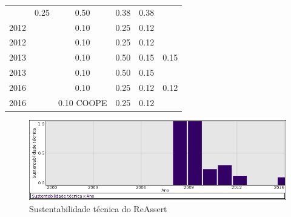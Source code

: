 \begin{table}[H]
\begin{tabular}{| l | c | c | c | c | c |}
          &
          0.25
          &
          0.50
          &
          0.38
          &
            {\color{red} 0.38}
          \\
            2012
          &
          
          &
          0.10
          &
          0.25
          &
          0.12
          &
          \\
            2012
          &
          
          &
          0.10
          &
          0.25
          &
          0.12
          &
          \\
\hline
            2013
          &
          
          &
          0.10
          &
          0.50
          &
          0.15
          &
            {\color{red} 0.15}
          \\
            2013
          &
          
          &
          0.10
          &
          0.50
          &
          0.15
          &
          \\
\hline
            2016
          &
          
          &
          0.10
          &
          0.25
          &
          0.12
          &
            {\color{red} 0.12}
          \\
            2016
          &
          
          &
          0.10
            {\tiny COOPE}
          &
          0.25
          &
          0.12
          &
          \\
\hline
\end{tabular}
\end{table}

\begin{figure}[h]
  \center
  \includegraphics[scale=0.50]{imagens/softwares-charts/reassert.png}
  \caption{Sustentabilidade técnica do ReAssert}
\end{figure}


